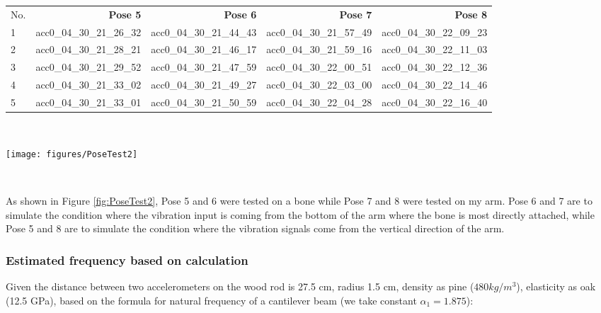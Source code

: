 \documentclass{sigchi}
\begin{document}
\begin{table*}
  \centering
  \begin{tabular}{l r r r r }
    No.
    & {\small{\textbf{Pose 5}}} 
    & {\small{\textbf{Pose 6}}}
    & {\small{\textbf{Pose 7}}} 
    & {\small{\textbf{Pose 8}}} \\
   1 & acc0\_04\_30\_21\_26\_32 & acc0\_04\_30\_21\_44\_43 & acc0\_04\_30\_21\_57\_49 & acc0\_04\_30\_22\_09\_23 \\
   2 & acc0\_04\_30\_21\_28\_21 & acc0\_04\_30\_21\_46\_17 & acc0\_04\_30\_21\_59\_16 & acc0\_04\_30\_22\_11\_03 \\
   3 & acc0\_04\_30\_21\_29\_52 & acc0\_04\_30\_21\_47\_59 & acc0\_04\_30\_22\_00\_51 & acc0\_04\_30\_22\_12\_36 \\
   4 & acc0\_04\_30\_21\_33\_02 & acc0\_04\_30\_21\_49\_27 & acc0\_04\_30\_22\_03\_00 & acc0\_04\_30\_22\_14\_46 \\
   5 & acc0\_04\_30\_21\_33\_01 & acc0\_04\_30\_21\_50\_59 & acc0\_04\_30\_22\_04\_28 & acc0\_04\_30\_22\_16\_40 \\
  \end{tabular}
  \caption{references for the linear sweep experiments round 2}~\label{tab:sweep2}
\end{table*}

\begin{figure*}
  \centering
  \texttt{[image: figures/PoseTest2]}
  \caption{Pose 5~8 for accelerometers measurement: (a) bone hitting the vibrator horizontally; (b) bone hitting the vibrator vertically; (c) vibrating under arm bottom; (d) vibrating horizontally towards the arm.}
    ~\label{fig:PoseTest2}
\end{figure*}

As shown in Figure \ref{fig:PoseTest2}, Pose 5 and 6 were tested on a bone while Pose 7 and 8 were tested on my arm. Pose 6 and 7 are to simulate the condition where the vibration input is coming from the bottom of the arm where the bone is most directly attached, while Pose 5 and 8 are to simulate the condition where the vibration signals come from the vertical direction of the arm. 

\subsubsection{Estimated frequency based on calculation} 

Given the distance between two accelerometers on the wood rod is 27.5 cm, radius 1.5 cm, density as pine ($480kg/m^3$), elasticity as oak (12.5 GPa), based on the formula for natural frequency of a cantilever beam (we take constant $\alpha_1 = 1.875$):
\end{document}
